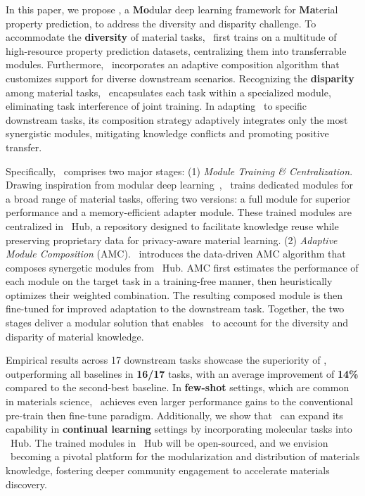 In this paper, we propose \name, a \textbf{Mo}dular deep learning framework for \textbf{Ma}terial property prediction, to address the diversity and disparity challenge. To accommodate the \textbf{diversity} of material tasks, \name \ first trains on a multitude of high-resource property prediction datasets, centralizing them into transferrable modules. Furthermore, \name \ incorporates an adaptive composition algorithm that customizes support for diverse downstream scenarios.
Recognizing the \textbf{disparity} among material tasks, \name \ encapsulates each task within a specialized module, eliminating task interference of joint training. In adapting \name \ to specific downstream tasks, its composition strategy adaptively integrates only the most synergistic modules, mitigating knowledge conflicts and promoting positive transfer.

Specifically, \name \ comprises two major stages: (1) \textit{Module Training \& Centralization}. Drawing inspiration from modular deep learning~\cite{pfeiffer2023modular}, \name \ trains dedicated modules for a broad range of material tasks, offering two versions: a full module for superior performance and a memory-efficient adapter module. These trained modules are centralized in \name \ Hub, a repository designed to facilitate knowledge reuse while preserving proprietary data for privacy-aware material learning. (2) \textit{Adaptive Module Composition} (AMC). \name \ introduces the data-driven AMC algorithm that composes synergetic modules from \name \ Hub. AMC first estimates the performance of each module on the target task in a training-free manner, then heuristically optimizes their weighted combination. The resulting composed module is then fine-tuned for improved adaptation to the downstream task. Together, the two stages deliver a modular solution that enables \name \ to account for the diversity and disparity of material knowledge.

Empirical results across 17 downstream tasks showcase the superiority of \name, outperforming all baselines in \textbf{16/17} tasks, with an average improvement of \textbf{14\%} compared to the second-best baseline. In \textbf{few-shot} settings, which are common in materials science,  \name \ achieves even larger performance gains to the conventional pre-train then fine-tune paradigm. Additionally, we show that \name \ can expand its capability in \textbf{continual learning} settings by incorporating molecular tasks into \name \ Hub. The trained modules in \name \ Hub will be open-sourced, and we envision \name \ becoming a pivotal platform for the modularization and distribution of materials knowledge, fostering deeper community engagement to accelerate materials discovery.